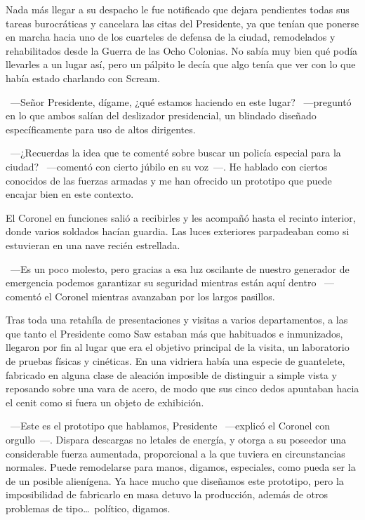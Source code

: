 Nada más llegar a su despacho le fue notificado que dejara pendientes todas sus tareas burocráticas y cancelara las citas del Presidente, ya que tenían que ponerse en marcha hacia uno de los cuarteles de defensa de la ciudad, remodelados y rehabilitados desde la Guerra de las Ocho Colonias. No sabía muy bien qué podía llevarles a un lugar así, pero un pálpito le decía que algo tenía que ver con lo que había estado charlando con Scream.

~---Señor Presidente, dígame, ¿qué estamos haciendo en este lugar? ~---preguntó en lo que ambos salían del deslizador presidencial, un blindado diseñado específicamente para uso de altos dirigentes.

~---¿Recuerdas la idea que te comenté sobre buscar un policía especial para la ciudad? ~---comentó con cierto júbilo en su voz~---. He hablado con ciertos conocidos de las fuerzas armadas y me han ofrecido un prototipo que puede encajar bien en este contexto.

El Coronel en funciones salió a recibirles y les acompañó hasta el recinto interior, donde varios soldados hacían guardia. Las luces exteriores parpadeaban como si estuvieran en una nave recién estrellada.

~---Es un poco molesto, pero gracias a esa luz oscilante de nuestro generador de emergencia podemos garantizar su seguridad mientras están aquí dentro ~---comentó el Coronel mientras avanzaban por los largos pasillos.

Tras toda una retahíla de presentaciones y visitas a varios departamentos, a las que tanto el Presidente como Saw estaban más que habituados e inmunizados, llegaron por fin al lugar que era el objetivo principal de la visita, un laboratorio de pruebas físicas y cinéticas. En una vidriera había una especie de guantelete, fabricado en alguna clase de aleación imposible de distinguir a simple vista y reposando sobre una vara de acero, de modo que sus cinco dedos apuntaban hacia el cenit como si fuera un objeto de exhibición.

~---Este es el prototipo que hablamos, Presidente ~---explicó el Coronel con orgullo~---. Dispara descargas no letales de energía, y otorga a su poseedor una considerable fuerza aumentada, proporcional a la que tuviera en circunstancias normales. Puede remodelarse para manos, digamos, especiales, como pueda ser la de un posible alienígena. Ya hace mucho que diseñamos este prototipo, pero la imposibilidad de fabricarlo en masa detuvo la producción, además de otros problemas de tipo\dots\ político, digamos.


